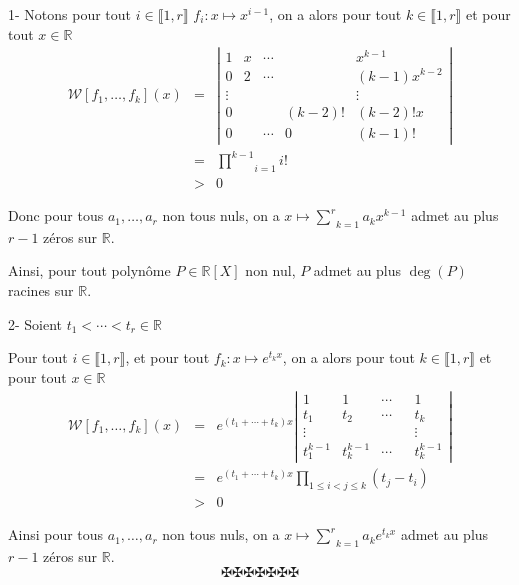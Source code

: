 1- Notons pour tout $i \in \llbracket 1, r \rrbracket$ $f_i : x \longmapsto
x^{i - 1}$, on a alors pour tout $k \in \llbracket 1, r \rrbracket$ et pour
tout $x \in \mathbb{R}$
\begin{eqnarray*}
  \mathcal{W} [f_1, \ldots, f_k] (x) & = & \left| \begin{array}{ccccc}
    1 & x & \cdots &  & x^{k - 1}\\
    0 & 2 & \cdots &  & (k - 1) x^{k - 2}\\
    \vdots &  &  &  & \vdots\\
    0 &  &  & (k - 2) ! & (k - 2) !x\\
    0 &  & \cdots & 0 & (k - 1) !
  \end{array} \right|\\
  & = & \underset{i = 1}{\overset{k - 1}{\prod}} i!\\
  & > & 0
\end{eqnarray*}

Donc pour tous $a_1, \ldots, a_r$ non tous nuls, on a $x \longmapsto
\underset{k = 1}{\overset{r}{\sum}} a_k x^{k - 1}$ admet au plus~$r - 1$
z{\'e}ros sur $\mathbb{R}$.

Ainsi, pour tout polyn{\^o}me $P \in \mathbb{R} [X]$ non nul, $P$ admet au
plus $\deg (P)$ racines sur $\mathbb{R}$.

2- Soient $t_1 < \cdots < t_r \in \mathbb{R}$

Pour tout $i \in \llbracket 1, r \rrbracket$, et pour tout $f_k : x
\longmapsto e^{t_k x}$, on a alors pour tout $k \in \llbracket 1, r
\rrbracket$ et pour tout $x \in \mathbb{R}$
\begin{eqnarray*}
  \mathcal{W} [f_1, \ldots, f_k] (x) & = & e^{(t_1 + \cdots + t_k) x} \left|
  \begin{array}{ccccc}
    1 & 1 & \cdots &  & 1\\
    t_1 & t_2 & \cdots &  & t_k\\
    \vdots &  &  &  & \vdots\\
    t^{k - 1}_1 & t^{k - 1}_k & \cdots &  & t^{k - 1}_k
  \end{array} \right|\\
  & = & e^{(t_1 + \cdots + t_k) x} \underset{1 \leqslant i < j \leqslant
  k}{\prod} (t_j - t_i)\\
  & > & 0
\end{eqnarray*}

Ainsi pour tous $a_1, \ldots, a_r$ non tous nuls, on a $x \longmapsto
\underset{k = 1}{\overset{r}{\sum}} a_k e^{t_k x}$ admet au plus~$r - 1$
z{\'e}ros sur $\mathbb{R}$.
\[ \maltese \maltese \maltese \maltese \maltese \maltese \maltese \]
